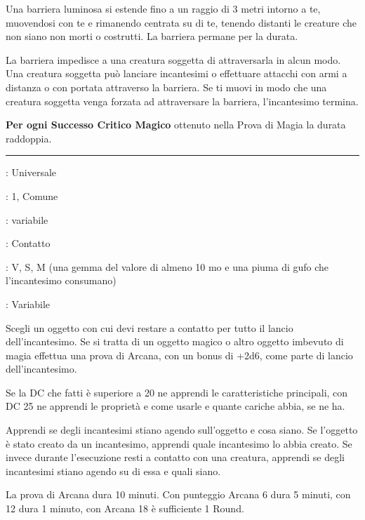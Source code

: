 \begin{multicols}{2}
Una barriera luminosa si estende fino a un raggio di 3 metri intorno a te, muovendosi con te e rimanendo centrata su di te, tenendo distanti le creature che non siano non morti o costrutti. La barriera permane per la durata.

La barriera impedisce a una creatura soggetta di attraversarla in alcun modo. Una creatura soggetta può lanciare incantesimi o effettuare attacchi con armi a distanza o con portata attraverso la barriera. Se ti muovi in modo che una creatura soggetta venga forzata ad attraversare la barriera, l'incantesimo termina.

\textbf{Per ogni Successo Critico Magico} ottenuto nella Prova di Magia la durata raddoppia.

\smallskip\noindent\rule{\linewidth}{2pt} \hypertarget{Identificare}{}\smallskip{}
\noindent
\begin{description}[noitemsep, topsep=0pt, parsep=0pt, partopsep=0pt, leftmargin=0cm, labelwidth=2.8cm]
	\item[\textbf{Lista di Magia}]: Universale
	\item[\textbf{Livello}]: 1, Comune
	\item[\textbf{T. di Lancio}]: variabile
	\item[\textbf{Gittata}]: Contatto
	\item[\textbf{Componenti}]: V, S, M (una gemma del valore di almeno 10 mo e una piuma di gufo che l'incantesimo consumano)
	\item[\textbf{Durata}]: Variabile
\end{description}

Scegli un oggetto con cui devi restare a contatto per tutto il lancio dell'incantesimo. Se si tratta di un oggetto magico o altro oggetto imbevuto di magia effettua una prova di Arcana, con un bonus di +2d6, come parte di lancio dell'incantesimo.

Se la DC che fatti è superiore a 20 ne apprendi le caratteristiche principali, con DC 25 ne apprendi le proprietà e come usarle e quante cariche abbia, se ne ha.

Apprendi se degli incantesimi stiano agendo sull'oggetto e cosa siano. Se l'oggetto è stato creato da un incantesimo, apprendi quale incantesimo lo abbia creato. Se invece durante l'esecuzione resti a contatto con una creatura, apprendi se degli incantesimi stiano agendo su di essa e quali siano.

La prova di Arcana dura 10 minuti. Con punteggio Arcana 6 dura 5 minuti, con 12 dura 1 minuto, con Arcana 18 è sufficiente 1 Round.


\end{multicols}
